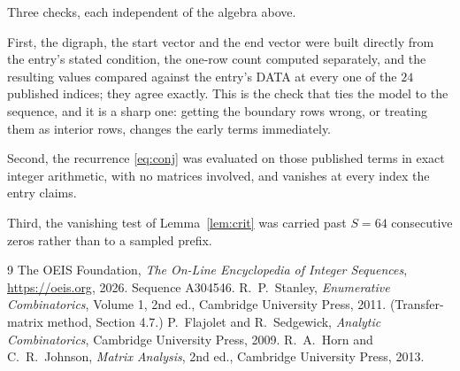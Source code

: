 \documentclass[11pt,a4paper]{article}
\theoremstyle{plain}
\theoremstyle{definition}
\begin{document}
Three checks, each independent of the algebra above.

First, the digraph, the start vector and the end vector were built directly from the
entry's stated condition, the one-row count computed separately, and the resulting values
compared against the entry's DATA at every one of the $24$ published indices; they
agree exactly. This is the check that ties the model to the sequence, and it is a sharp one:
getting the boundary rows wrong, or treating them as interior rows, changes the early terms
immediately.

Second, the recurrence \eqref{eq:conj} was evaluated on those published terms in exact
integer arithmetic, with no matrices involved, and vanishes at every index the entry claims.

Third, the vanishing test of Lemma~\ref{lem:crit} was carried past $S=64$ consecutive
zeros rather than to a sampled prefix.

\begin{thebibliography}{9}
 The OEIS Foundation, \emph{The On-Line Encyclopedia of Integer
Sequences}, \url{https://oeis.org}, 2026. Sequence A304546.
 R.~P.~Stanley, \emph{Enumerative Combinatorics}, Volume 1, 2nd ed.,
Cambridge University Press, 2011. (Transfer-matrix method, Section 4.7.)
 P.~Flajolet and R.~Sedgewick, \emph{Analytic Combinatorics}, Cambridge
University Press, 2009.
 R.~A.~Horn and C.~R.~Johnson, \emph{Matrix Analysis}, 2nd ed., Cambridge
University Press, 2013.
\end{thebibliography}
\end{document}
